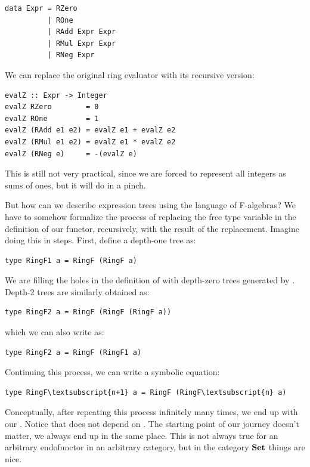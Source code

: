 \begin{Verbatim}[commandchars=\\\{\}]
data Expr = RZero 
          | ROne
          | RAdd Expr Expr
          | RMul Expr Expr
          | RNeg Expr
\end{Verbatim}
We can replace the original ring evaluator with its recursive version:

\begin{Verbatim}[commandchars=\\\{\}]
evalZ :: Expr -> Integer
evalZ RZero        = 0
evalZ ROne         = 1
evalZ (RAdd e1 e2) = evalZ e1 + evalZ e2
evalZ (RMul e1 e2) = evalZ e1 * evalZ e2
evalZ (RNeg e)     = -(evalZ e)
\end{Verbatim}
This is still not very practical, since we are forced to represent all
integers as sums of ones, but it will do in a pinch.

But how can we describe expression trees using the language of
F-algebras? We have to somehow formalize the process of replacing the
free type variable in the definition of our functor, recursively, with
the result of the replacement. Imagine doing this in steps. First,
define a depth-one tree as:

\begin{Verbatim}[commandchars=\\\{\}]
type RingF1 a = RingF (RingF a)
\end{Verbatim}
We are filling the holes in the definition of  with
depth-zero trees generated by . Depth-2 trees are
similarly obtained as:

\begin{Verbatim}[commandchars=\\\{\}]
type RingF2 a = RingF (RingF (RingF a))
\end{Verbatim}
which we can also write as:

\begin{Verbatim}[commandchars=\\\{\}]
type RingF2 a = RingF (RingF1 a)
\end{Verbatim}
Continuing this process, we can write a symbolic equation:

\begin{Verbatim}[commandchars=\\\{\}]
type RingF\textsubscript{n+1} a = RingF (RingF\textsubscript{n} a)
\end{Verbatim}
Conceptually, after repeating this process infinitely many times, we end
up with our . Notice that  does not depend on
. The starting point of our journey doesn't matter, we always
end up in the same place. This is not always true for an arbitrary
endofunctor in an arbitrary category, but in the category $\mathbf{Set}$
things are nice.

